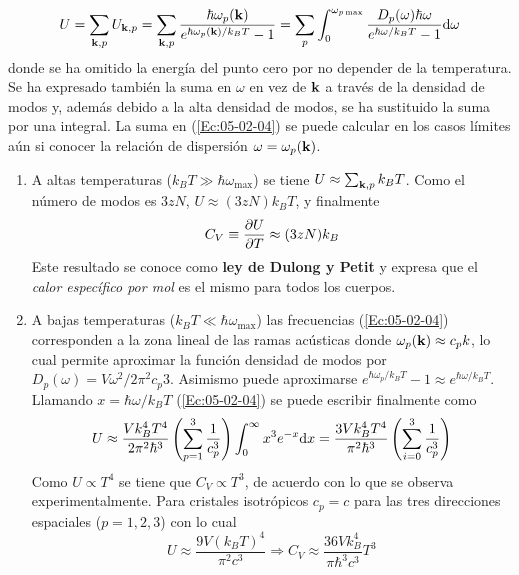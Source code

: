\begin{equation}
    U = \sum_{\mathbf{k},p} U_{\mathbf{k},p} = \sum_{\mathbf{k},p} \frac{\hbar \omega_p (\mathbf{k})}{e^{\hbar \omega_p (\mathbf{k})/k_B T} - 1} = \sum_p \int_{0}^{\omega_{p \max}} \frac{D_p (\omega) \hbar \omega}{e^{\hbar \omega/ k_B T} - 1} \mathrm{d} \omega  \label{Ec:05-02-04}
\end{equation}
donde se ha omitido la energía del punto cero por no depender de la temperatura. Se ha expresado también la suma en $\omega$ en vez de $\mathbf{k}$ a través de la densidad de modos y, además debido a la alta densidad de modos, se ha sustituido la suma por una integral. La suma en (\ref{Ec:05-02-04}) se puede calcular en los casos límites aún si conocer la relación de dispersión $\omega=\omega_p (\mathbf{k})$. 

\begin{enumerate}
    \item A altas temperaturas ($k_BT \gg \hbar \omega_{\max}$) se tiene $U\approx \sum_{\mathbf{k},p} k_B T$. Como el número de modos es $3zN$, $U\approx (3zN)k_B T$, y finalmente 
    \begin{equation}
        C_V \equiv \frac{\partial U}{\partial T} \approx (3zN)k_B
    \end{equation}
    Este resultado se conoce como \textbf{ley de Dulong y Petit} y expresa que el \textit{calor específico por mol} es el mismo para todos los cuerpos. 
    \item A bajas temperaturas ($k_B T \ll \hbar \omega_{\max}$) las frecuencias (\ref{Ec:05-02-04}) corresponden a la zona lineal de las ramas acústicas donde $\omega_p (\mathbf{k}) \approx c_p k$, lo cual permite aproximar la función densidad de modos por $D_p (\omega) = V \omega^2 / 2 \pi^2 c_p3$. Asimismo puede aproximarse $e^{\hbar \omega_p/ k_B T} - 1 \approx e^{\hbar \omega / k_B T}$. Llamando $x=\hbar \omega / k_B T$  (\ref{Ec:05-02-04}) se puede escribir finalmente como 
    \begin{equation}
        U \approx \frac{Vk_B^4T^4}{2 \pi^2 \hbar^3} \left( \sum_{p=1}^3 \frac{1}{c_p^3} \right) \int_0^\infty x^3 e^{-x} \mathrm{d} x = \frac{3Vk_B^4 T^4}{\pi^2 \hbar^3} \left( \sum_{i=0}^3 \frac{1}{c_p^3} \right)
    \end{equation}
    Como $U\propto T^4$ se tiene que $C_V \propto T^3$, de acuerdo con lo que se observa experimentalmente. Para cristales isotrópicos $c_p=c$ para las tres direcciones espaciales ($p=1,2,3$) con lo cual
    \begin{equation}
        U \approx \frac{9V(k_B T)^4}{\pi^2 c^3} \Rightarrow C_V \approx \frac{36Vk_B^4}{\pi \hbar^3 c^3} T^3

\end{equation}
\end{enumerate}
